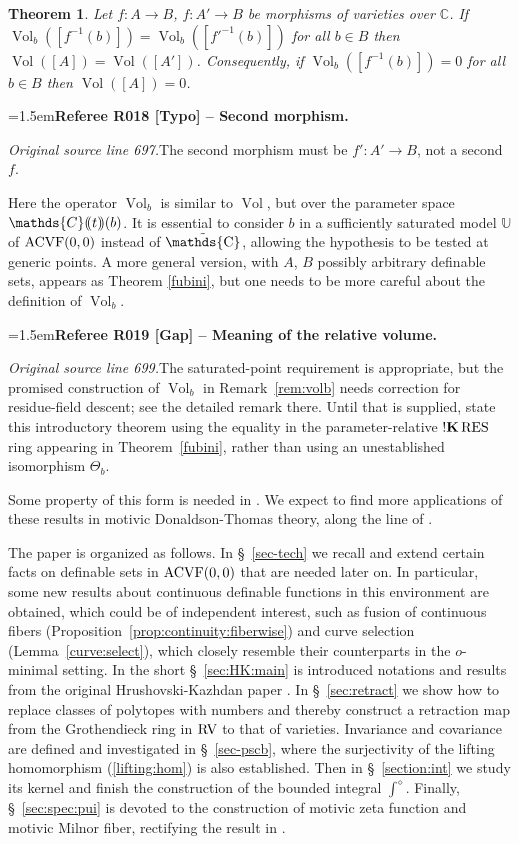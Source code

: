 \documentclass[12pt]{amsart}
\newcommand{\RefereeRemark}[4]{%
  \par\medskip\begingroup\normalfont\small\color{RefereePurple}%
  \emergencystretch=1.5em\noindent\textbf{Referee R#1 [#2] -- #3.}\par\nobreak\noindent #4\par
  \endgroup\medskip
}
\theoremstyle{plain}
\theoremstyle{definition}
\theoremstyle{remark}
\numberwithin{equation}{section}
\theoremstyle{plain}
\newtheorem*{thm*}{Theorem}
\newcommand{\ACVF}{\textup{ACVF}}
\newcommand{\RV}{\textup{RV}}
\newcommand{\C}{\mathds{C}}
\newcommand{\omin}{$o$\nobreakdash}
\newcommand{\0}{\emptyset}
\newcommand{\dpar}[1]{%
   (\mkern-4mu (#1 )\mkern-4mu )}
\newcommand{\bb}[1]{\mathbb{#1}}
\newcommand{\fun}{\longrightarrow}
\newcommand{\RES}{\textup{RES}}
\DeclareMathOperator{\sggk}{!\mathbf{K}}
\DeclareMathOperator{\puC}{\tilde \C}
\DeclareMathOperator{\Vol}{Vol}
\begin{document}
\begin{thm*}
Let $f :A \fun B$, $f : A' \fun B$ be morphisms of varieties over $\C$. If $\Vol_b([f^{-1}(b)])=\Vol_b([f'^{-1}(b)])$ for all $b\in B$  then $\Vol([A])=\Vol([A'])$. Consequently, if $\Vol_b([f^{-1}(b)])= 0$ for all $b\in B$ then $\Vol([A]) = 0$.
\end{thm*}

\RefereeRemark{018}{Typo}{Second morphism}{%
\textit{Original source line 697.}\quad The second morphism must be $f':A'\longrightarrow B$, not a second $f$.
}

Here the operator $\Vol_b$ is similar to $\Vol$, but over the parameter space $\C\dpar t (b)$. It is essential to consider $b$ in a sufficiently saturated model $\bb U$ of $\ACVF(0,0)$ instead of $\puC$, allowing the hypothesis to be tested at generic points.  A more general version, with $A$, $B$ possibly arbitrary definable sets, appears as Theorem \ref{fubini}, but one needs to be more careful about the definition of $\Vol_b$.

\RefereeRemark{019}{Gap}{Meaning of the relative volume}{%
\textit{Original source line 699.}\quad The saturated-point requirement is appropriate, but the promised construction of $\Vol_b$ in Remark~\ref{rem:volb} needs correction for residue-field descent; see the detailed remark there. Until that is supplied, state this introductory theorem using the equality in the parameter-relative $\sggk\RES$ ring appearing in Theorem~\ref{fubini}, rather than using an unestablished isomorphism $\Theta_b$.
}

Some property of this form is needed in \cite{loeser2019motivic}.
We expect to find more applications of these results in motivic Donaldson-Thomas theory, along the line of \cite{Nic:Pay:trop:fub}.



The paper is organized as follows. In \S~\ref{sec-tech} we recall and extend certain facts on definable sets in $\ACVF(0,0)$ that are needed later on. In particular,  some new results about continuous definable functions in this environment are obtained, which could be of independent interest, such as fusion of continuous fibers (Proposition~\ref{prop:continuity:fiberwise}) and curve selection (Lemma~\ref{curve:select}), which closely resemble their counterparts in the \omin-minimal setting. In the short \S~\ref{sec:HK:main} is introduced notations and results from the original Hrushovski-Kazhdan paper \cite{hrushovski:kazhdan:integration:vf}. In \S~\ref{sec:retract} we show how to replace classes of polytopes with numbers  and thereby construct a retraction map from the Grothendieck ring in $\RV$ to that of varieties. Invariance and covariance are defined and investigated  in \S~\ref{sec-pscb}, where the surjectivity of the lifting homomorphism (\ref{lifting:hom}) is also established. Then in \S~\ref{section:int} we study its kernel and finish the construction of the bounded integral $\int^\diamond$. Finally, \S~\ref{sec:spec:pui} is devoted to the construction of motivic zeta function and motivic Milnor fiber, rectifying the result in \cite{hru:loe:lef}.
\end{document}
